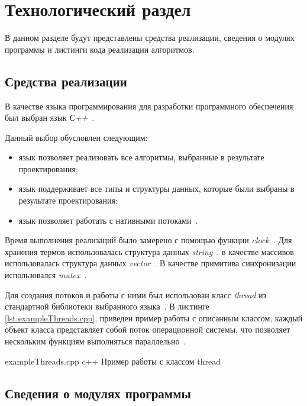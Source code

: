 \chapter{Технологический раздел}

В данном разделе будут представлены средства реализации, сведения о модулях программы и листинги кода реализации алгоритмов.


\section{Средства реализации}

В качестве языка программирования для разработки программного обеспечения был выбран язык \textit{С++}~\cite{cpp}.

Данный выбор обусловлен следующим: 
\begin{itemize}
	\item язык позволяет реализовать все алгоритмы, выбранные в результате
	проектирования;
	\item язык поддерживает все типы и структуры данных, которые были выбраны в результате проектирования;
	\item язык позволяет работать с нативными потоками~\cite{thread}.
\end{itemize}


Время выполнения реализаций было замерено с помощью функции \textit{clock}~\cite{clock}. 
Для хранения термов использовалась структура данных \textit{string}~\cite{wstring}, в качестве массивов использовалась структура данных \textit{vector}~\cite{vector}.
В качестве примитива синхронизации использовался \textit{mutex}~\cite{mutex}.

Для создания потоков и работы с ними был использован класс \textit{thread} из стандартной библиотеки выбранного языка~\cite{thread}.
В листинге \ref{lst:exampleThreads.cpp}, приведен пример работы с описанным классом, каждый объект класса представляет собой поток операционной системы, что позволяет нескольким функциям выполняться параллельно~\cite{thread}. 

\clearpage
{}
{exampleThreads.cpp} %
{c++} %
{Пример работы с классом thread} %


\section{Сведения о модулях программы}

